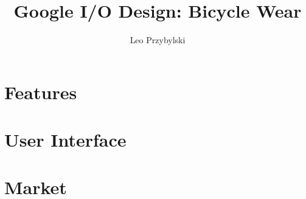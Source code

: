 \documentclass[12pt,notitlepage]{article}
\author{Leo Przybylski}
\title{Google I/O Design: Bicycle Wear}
\begin{document}
\maketitle
\tableofcontents

\abstract{}

\section{Features}
\section{User Interface}
\section{Market}
\end{document}
